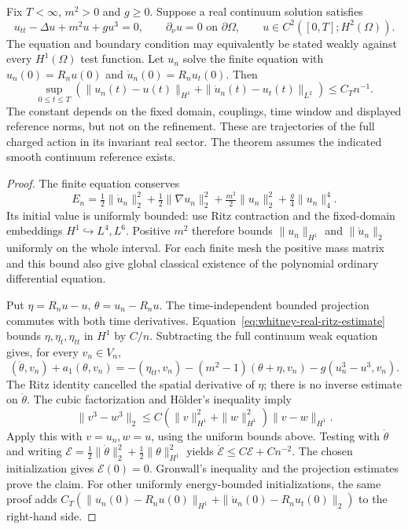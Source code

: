 \begin{theorem}
\label{thm:whitney-real-continuum-trajectory}
Fix \(T<\infty\), \(m^2>0\) and \(g\geq0\). Suppose a real
continuum solution satisfies
\begin{equation}
 u_{tt}-\Delta u+m^2u+gu^3=0,\qquad
 \partial_\nu u=0\text{ on }\partial\Omega,
 \qquad u\in C^2([0,T];H^2(\Omega)).
 \label{eq:whitney-real-continuum-reference}
\end{equation}
The equation and boundary condition may equivalently be stated weakly
against every \(H^1(\Omega)\) test function. Let \(u_n\) solve
the finite equation with \(u_n(0)=R_nu(0)\) and
\(\dot u_n(0)=R_nu_t(0)\). Then
\begin{equation}
 \sup_{0\leq t\leq T}
 \left(\|u_n(t)-u(t)\|_{H^1}
       +\|\dot u_n(t)-u_t(t)\|_{L^2}\right)
 \leq C_T n^{-1}.
 \label{eq:whitney-real-trajectory-error}
\end{equation}
The constant depends on the fixed domain, couplings, time window and
displayed reference norms, but not on the refinement. These are
trajectories of the full charged action in its invariant real sector.
The theorem assumes the indicated smooth continuum reference exists.
\end{theorem}
\begin{proof}
The finite equation conserves
\[
 E_n=\tfrac12\|\dot u_n\|_2^2+\tfrac12\|\nabla u_n\|_2^2
             +\tfrac{m^2}{2}\|u_n\|_2^2+\tfrac g4\|u_n\|_4^4.
\]
Its initial value is uniformly bounded: use Ritz contraction and the
fixed-domain embeddings \(H^1\hookrightarrow L^4,L^6\).
Positive \(m^2\) therefore bounds \(\|u_n\|_{H^1}\) and
\(\|\dot u_n\|_2\) uniformly on the whole interval. For each finite
mesh the positive mass matrix and this bound also give global classical
existence of the polynomial ordinary differential equation.

Put \(\eta=R_nu-u\), \(\theta=u_n-R_nu\).
The time-independent bounded projection commutes with both time
derivatives. Equation~\eqref{eq:whitney-real-ritz-estimate} bounds
\(\eta,\eta_t,\eta_{tt}\) in \(H^1\) by \(C/n\).
Subtracting the full continuum weak equation gives, for every
\(v_n\in V_n\),
\[
 (\ddot\theta,v_n)+a_1(\theta,v_n)
 =-(\eta_{tt},v_n)-(m^2-1)(\theta+\eta,v_n)
                    -g(u_n^3-u^3,v_n).
\]
The Ritz identity cancelled the spatial derivative of \(\eta\);
there is no inverse estimate on \(\dot\theta\).
The cubic factorization and H\"older's inequality imply
\[
 \|v^3-w^3\|_2
 \leq C(\|v\|_{H^1}^2+\|w\|_{H^1}^2)
                      \|v-w\|_{H^1}.
\]
Apply this with \(v=u_n,w=u\), using the uniform bounds above.
Testing with \(\dot\theta\) and writing
\(\mathcal E=\tfrac12\|\dot\theta\|_2^2+
\tfrac12\|\theta\|_{H^1}^2\) yields
\(\dot{\mathcal E}\leq C\mathcal E+C n^{-2}\).
The chosen initialization gives \(\mathcal E(0)=0\).
Gronwall's inequality and the projection estimates prove the claim.
For other uniformly energy-bounded initializations, the same proof adds
\(C_T(\|u_n(0)-R_nu(0)\|_{H^1}+
\|\dot u_n(0)-R_nu_t(0)\|_2)\) to the right-hand side.
\end{proof}

